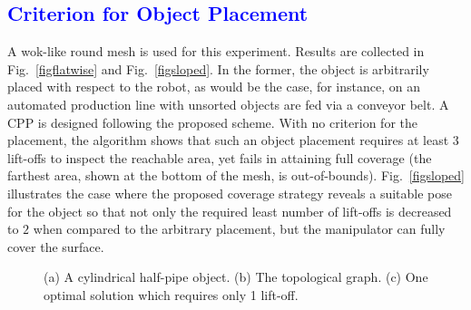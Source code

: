 \documentclass[journal]{IEEEtran}
\begin{document}
\textcolor{blue}{\subsection{Criterion for Object Placement }\label{sec:wok_sim_examples}}
A wok-like round mesh is used for this experiment. Results are collected in Fig.~\ref{figflatwise} and Fig.~\ref{figsloped}. 
In the former, the object is arbitrarily placed with respect to the robot, as would be the case, for instance, on an automated production line with unsorted objects are fed via a conveyor belt. A CPP is designed following the proposed scheme. With no criterion for the placement, the algorithm shows that such an object placement requires at least $3$ lift-offs to inspect the reachable area, yet fails in attaining full coverage (the farthest area, shown at the bottom of the mesh, is out-of-bounds).
Fig.~\ref{figsloped} illustrates the case where the proposed coverage strategy reveals a suitable pose for the object so that not only the required least number of lift-offs is decreased to $2$ when compared to the arbitrary placement, 
but the manipulator can fully cover the surface.

\begin{figure}[t]
\centering
{} \qquad
{} \qquad
{}
\caption{(a) A cylindrical half-pipe object. (b) The topological graph. (c) One optimal solution which requires only 1 lift-off.}
\label{fighalfpipe}
\end{figure}
\end{document}
